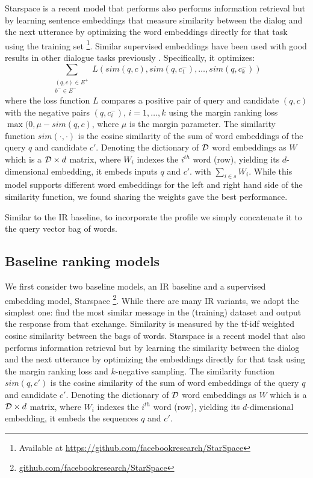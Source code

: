 \documentclass[11pt,a4paper]{article}
\begin{document}
Starspace is a recent model that performs also performs information retrieval but by learning sentence embeddings that measure similarity between the dialog and the next utterance by optimizing the word embeddings directly for that task using the training set \citep{wu2017starspace}\footnote{Available at \url{https://github.com/facebookresearch/StarSpace}}. Similar supervised embeddings have been used with good results in other dialogue tasks previously \citep{dodge2015evaluating}. 
Specifically, it optimizes:
\[
\label{math:loss}
\sum_{\substack{(q,c) \in E^+\\ b^{-} \in E^{-}}} L(sim(q, c), sim(q, c^{-}_1), \dots, sim(q, c^{-}_k))
\]
where the loss function $L$ compares a positive pair of query and candidate $(q,c)$ with the negative pairs $(q, c^{-}_i)$, $i=1,\dots, k$ using the margin ranking loss $\max(0,\mu - sim(q,c)$, where $\mu$ is the margin parameter. The similarity function $sim(\cdot, \cdot)$ is the cosine similarity of the sum of word embeddings of the query $q$ and candidate $c'$. Denoting the dictionary of ${\cal D}$ word embeddings as $W$ which is a ${\cal D} \times d$ matrix, where $W_i$ indexes the $i^{th}$ word (row), yielding its $d$-dimensional embedding, it embeds inputs $q$ and $c'$. 
  with $\sum_{i \in s} W_i$. While this model supports different word embeddings for the left and right hand side of the similarity function, we found sharing the weights gave the best performance.
  
Similar to the IR baseline, to incorporate the profile we simply concatenate it to the query vector bag of words. 
\else
\subsection{Baseline ranking models}
We first consider two baseline models, 
an IR baseline \cite{sordoni2015neural} and a supervised embedding model, Starspace \cite{wu2017starspace}\footnote{\url{github.com/facebookresearch/StarSpace}}. While there are many IR variants, we adopt the simplest one: find the most similar message in the (training) dataset and output the response from that exchange. Similarity is measured by the tf-idf weighted cosine similarity between the bags of words. 
Starspace is a recent model that also performs information retrieval but by learning the similarity
between the dialog and the next utterance by optimizing the embeddings directly for that task using the margin ranking loss and $k$-negative sampling. The similarity function $sim(q, c')$ is the cosine similarity of the sum of word embeddings of the query $q$ and candidate $c'$. Denoting the dictionary of ${\cal D}$ word embeddings as $W$ which is a ${\cal D} \times d$ matrix, where $W_i$ indexes the $i^{th}$ word (row), yielding its $d$-dimensional embedding, it embeds the sequences $q$ and $c'$.
\end{document}
